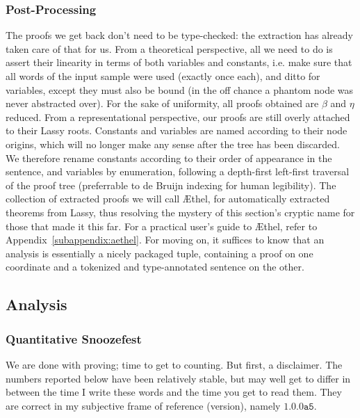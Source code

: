 \subsubsection{Post-Processing}
The proofs we get back don't need to be type-checked: the extraction has already taken care of that for us.
From a theoretical perspective, all we need to do is assert their linearity in terms of both variables and constants, i.e. make sure that all words of the input sample were used (exactly once each), and ditto for variables, except they must also be bound (in the off chance a phantom node was never abstracted over).
For the sake of uniformity, all proofs obtained are $\beta$ and $\eta$ reduced.
From a representational perspective, our proofs are still overly attached to their Lassy roots.
Constants and variables are named according to their node origins, which will no longer make any sense after the tree has been discarded.
We therefore rename constants according to their order of appearance in the sentence, and variables by enumeration, following a depth-first left-first traversal of the proof tree (preferrable to de Bruijn indexing for human legibility).
The collection of extracted proofs we will call \AE thel, for automatically extracted theorems from Lassy, thus resolving the mystery of this section's cryptic name for those that made it this far.
For a practical user's guide to \AE thel, refer to Appendix~\ref{subappendix:aethel}.
For moving on, it suffices to know that an analysis is essentially a nicely packaged tuple, containing a proof on one coordinate and a tokenized and type-annotated sentence on the other.

\subsection{Analysis}
\subsubsection{Quantitative Snoozefest}
We are done with proving; time to get to counting.
But first, a disclaimer.
The numbers reported below have been relatively stable, but may well get to differ in between the time I write these words and the time you get to read them.
They are correct in my subjective frame of reference (version), namely $\mathtt{1.0.0a5}$. 

